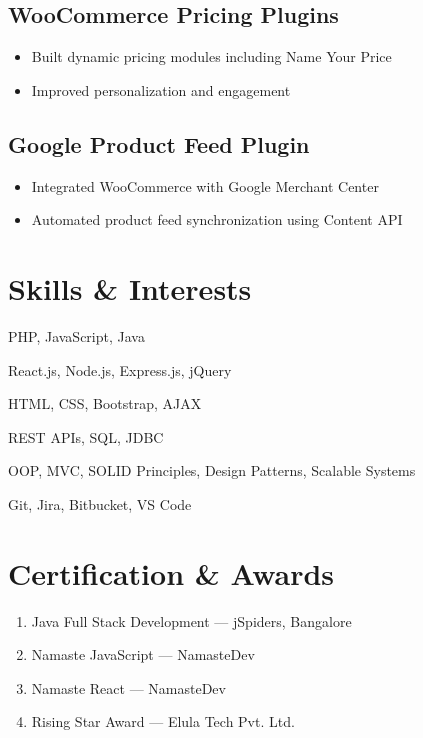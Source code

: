 \documentclass[11pt]{article}
\begin{document}
\subsection{WooCommerce Pricing Plugins}
\begin{itemize}
\item Built dynamic pricing modules including Name Your Price
\item Improved personalization and engagement
\end{itemize}

\subsection{Google Product Feed Plugin}
\begin{itemize}
\item Integrated WooCommerce with Google Merchant Center
\item Automated product feed synchronization using Content API
\end{itemize}

\section{Skills \& Interests}

\begin{description}[itemsep=0pt]
\item[Languages] PHP, JavaScript, Java
\item[Frameworks] React.js, Node.js, Express.js, jQuery
\item[Web] HTML, CSS, Bootstrap, AJAX
\item[Backend] REST APIs, SQL, JDBC
\item[Concepts] OOP, MVC, SOLID Principles, Design Patterns, Scalable Systems
\item[Tools] Git, Jira, Bitbucket, VS Code
\end{description}

\section{Certification \& Awards}

\begin{enumerate}[label=\null, left=0pt..0pt, itemsep=0pt]
\item Java Full Stack Development — jSpiders, Bangalore \hfill
\item Namaste JavaScript — NamasteDev \hfill
\item Namaste React — NamasteDev \hfill
\item Rising Star Award — Elula Tech Pvt. Ltd. \hfill
\end{enumerate}
\end{document}
